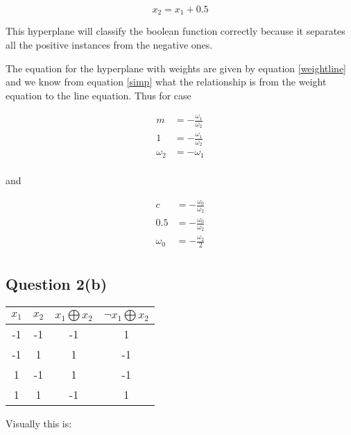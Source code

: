 \documentclass[10pt,a4paper]{article}
\begin{document}
\begin{equation}
x_2 = x_1 + 0.5
\end{equation}

This hyperplane will classify the boolean function correctly because it separates all the positive instances from the negative ones.

The equation for the hyperplane with weights are given by equation \ref{weightline} and we know from equation \ref{simp} what the relationship is from the weight equation to the line equation. Thus for case

\begin{equation}
\begin{split}
m &= -\frac{\omega_1}{\omega_2} \\
1 &= -\frac{\omega_1}{\omega_2} \\
\omega_2 &= -\omega_1 \\
\end{split}
\end{equation}

and

\begin{equation}
\begin{split}
c &= -\frac{\omega_0}{\omega_2}\\
0.5 &= -\frac{\omega_0}{\omega_2}\\
\omega_0 &= -\frac{\omega_2}{2}\\
\end{split}
\end{equation}


\subsection{Question 2(b)}

\begin{tabular}{|c|c|c|c|}
\hline
$x_1$ & $x_2$ & $x_1 \bigoplus x_2$ & $\neg x_1 \bigoplus x_2$ \\
\hline
-1 &-1 &-1 &1\\
-1 &1 &1 &-1\\
1 &-1 &1 &-1\\
1 &1 &-1 &1\\
\hline
\end{tabular}

Visually this is:

\begin{center}
\end{center}
\end{document}
